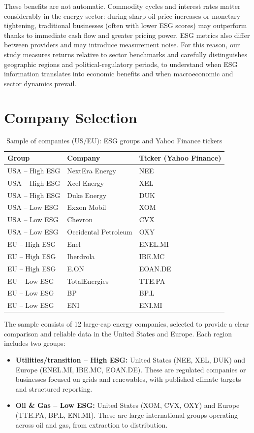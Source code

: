 \documentclass[12pt,a4paper]{article}
\begin{document}
These benefits are not automatic. Commodity cycles and interest rates matter considerably in the energy sector: during sharp oil-price increases or monetary tightening, traditional businesses (often with lower ESG scores) may outperform thanks to immediate cash flow and greater pricing power. ESG metrics also differ between providers and may introduce measurement noise. For this reason, our study measures returns relative to sector benchmarks and carefully distinguishes geographic regions and political-regulatory periods, to understand when ESG information translates into economic benefits and when macroeconomic and sector dynamics prevail.

\section{Company Selection}

\begin{table}[H]
\centering
\caption{Sample of companies (US/EU): ESG groups and Yahoo Finance tickers}
\small
\begin{tabular}{lll}
\toprule
\textbf{Group} & \textbf{Company} & \textbf{Ticker (Yahoo Finance)} \\
\midrule
USA -- High ESG & NextEra Energy & NEE \\
USA -- High ESG & Xcel Energy & XEL \\
USA -- High ESG & Duke Energy & DUK \\
USA -- Low ESG & Exxon Mobil & XOM \\
USA -- Low ESG & Chevron & CVX \\
USA -- Low ESG & Occidental Petroleum & OXY \\
EU -- High ESG & Enel & ENEL.MI \\
EU -- High ESG & Iberdrola & IBE.MC \\
EU -- High ESG & E.ON & EOAN.DE \\
EU -- Low ESG & TotalEnergies & TTE.PA \\
EU -- Low ESG & BP & BP.L \\
EU -- Low ESG & ENI & ENI.MI \\
\bottomrule
\end{tabular}
\end{table}

The sample consists of 12 large-cap energy companies, selected to provide a clear comparison and reliable data in the United States and Europe. Each region includes two groups:

\begin{itemize}
\item \textbf{Utilities/transition -- High ESG:} United States (NEE, XEL, DUK) and Europe (ENEL.MI, IBE.MC, EOAN.DE). These are regulated companies or businesses focused on grids and renewables, with published climate targets and structured reporting.
\item \textbf{Oil \& Gas -- Low ESG:} United States (XOM, CVX, OXY) and Europe (TTE.PA, BP.L, ENI.MI). These are large international groups operating across oil and gas, from extraction to distribution.
\end{itemize}
\end{document}
